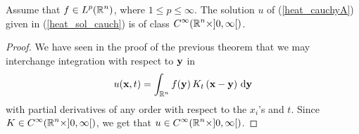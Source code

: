 \begin{prop}
Assume that $\displaystyle f \in L^p(\mathbb{R}^n)$, where $1\leq p \leq \infty$.  The
solution $u$ of (\ref{heat_cauchyA}) given in (\ref{heat_sol_cauch}) is
of class $\displaystyle C^\infty(\mathbb{R}^n\times ]0,\infty[)$.
\end{prop}

\begin{proof}
We have seen in the proof of the previous theorem that we may
interchange integration with respect to $\mathbf{y}$ in
\[
u(\mathbf{x},t) = 
\int_{\mathbb{R}^n} f(\mathbf{y})\,K_t\left(\mathbf{x} - \mathbf{y}\right) \,\mathrm{d}{\mathbf{y}}
\]
with partial derivatives of any order with respect to the $x_i$'s
and $t$.  Since $\displaystyle K \in C^\infty(\mathbb{R}^n \times ]0,\infty[)$,
we get that $\displaystyle u \in C^\infty(\mathbb{R}^n \times ]0,\infty[)$.
\end{proof}

